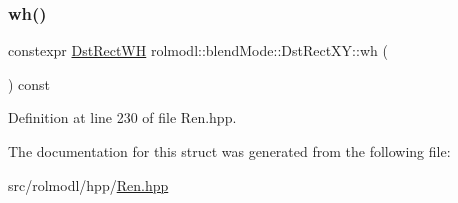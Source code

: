 \subsubsection{\texorpdfstring{wh()}{wh()}}
{\footnotesize\ttfamily constexpr \mbox{\hyperlink{structrolmodl_1_1blend_mode_1_1_dst_rect_w_h}{Dst\+Rect\+WH}} rolmodl\+::blend\+Mode\+::\+Dst\+Rect\+X\+Y\+::wh (\begin{DoxyParamCaption}{ }\end{DoxyParamCaption}) const\hspace{0.3cm}{\ttfamily [noexcept]}}



Definition at line 230 of file Ren.\+hpp.



The documentation for this struct was generated from the following file\+:\begin{DoxyCompactItemize}
\item 
src/rolmodl/hpp/\mbox{\hyperlink{_ren_8hpp}{Ren.\+hpp}}\end{DoxyCompactItemize}
